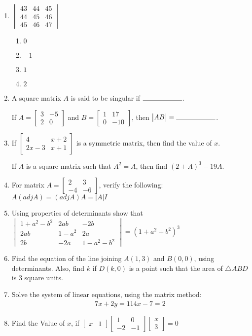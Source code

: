 \documentclass{article}
\newcommand{\myvec}[1]{\begin{bmatrix}#1\end{bmatrix}}
\newcommand{\mydet}[1]{\begin{vmatrix}#1\end{vmatrix}}
\begin{document}
\begin{enumerate}
   \item
    $\mydet{43 & 44 & 45 \\ 44 & 45 & 46 \\ 45 & 46 & 47}$
    \begin{enumerate}
        \item $0$
        \item $-1$
        \item $1$
        \item $2$
    \end{enumerate}

    \item A square matrix $A$ is said to be singular if $\rule{2cm}{0.15mm}$.

    If $A =\myvec{3 & -5 \\ 2 & 0}$ and 
    $B = \myvec{1 & 17 \\ 0 & -10}$, then $\mydet{AB} = \rule{2cm}{0.15mm}$.

    \item If $\myvec{4 & x+2 \\ 2x-3 & x+1}$ is a symmetric matrix, then find the value of $x$.

    If $A$ is a square matrix such that $A^2 = A$, then find $(2+A)^3 - 19A$.

    \item For matrix $A = \myvec{2 & 3 \\ -4 & -6}$, verify the following:
    $A(adj A) = (adj A)A = |A|I$

    \item Using properties of determinants show that
    $\mydet{1 + a^2 - b^2 & 2ab & -2b \\ 2ab & 1 - a^2 & 2a \\ 2b & -2a & 1 - a^2 - b^2 } = (1 + a^2 + b^2)^3$

    \item Find the equation of the line joining $A(1, 3)$ and $B(0, 0)$, using determinants. Also, find $k$ if $D(k, 0)$ is a point such that the area of $\triangle{ABD}$ is $3$ square units.
    
    \item Solve the system of linear equations, using the matrix method:
    \begin{align*}
        7x + 2y = 11
        4x - 7 = 2
    \end{align*}
    
    \item Find the Value of $x$, if
    $\myvec{x & 1}
    \myvec{1 & 0 \\ -2 & -1}
    \myvec{x \\ 3} = 0$
    

\end{enumerate}
\end{document}
